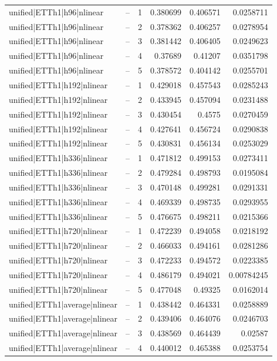 \begin{longtable}{llrrrr}
unified|ETTh1|h96|nlinear & -- & 1 & 0.380699 & 0.406571 & 0.0258711 \\
unified|ETTh1|h96|nlinear & -- & 2 & 0.378362 & 0.406257 & 0.0278954 \\
unified|ETTh1|h96|nlinear & -- & 3 & 0.381442 & 0.406405 & 0.0249623 \\
unified|ETTh1|h96|nlinear & -- & 4 & 0.37689 & 0.41207 & 0.0351798 \\
unified|ETTh1|h96|nlinear & -- & 5 & 0.378572 & 0.404142 & 0.0255701 \\
unified|ETTh1|h192|nlinear & -- & 1 & 0.429018 & 0.457543 & 0.0285243 \\
unified|ETTh1|h192|nlinear & -- & 2 & 0.433945 & 0.457094 & 0.0231488 \\
unified|ETTh1|h192|nlinear & -- & 3 & 0.430454 & 0.4575 & 0.0270459 \\
unified|ETTh1|h192|nlinear & -- & 4 & 0.427641 & 0.456724 & 0.0290838 \\
unified|ETTh1|h192|nlinear & -- & 5 & 0.430831 & 0.456134 & 0.0253029 \\
unified|ETTh1|h336|nlinear & -- & 1 & 0.471812 & 0.499153 & 0.0273411 \\
unified|ETTh1|h336|nlinear & -- & 2 & 0.479284 & 0.498793 & 0.0195084 \\
unified|ETTh1|h336|nlinear & -- & 3 & 0.470148 & 0.499281 & 0.0291331 \\
unified|ETTh1|h336|nlinear & -- & 4 & 0.469339 & 0.498735 & 0.0293955 \\
unified|ETTh1|h336|nlinear & -- & 5 & 0.476675 & 0.498211 & 0.0215366 \\
unified|ETTh1|h720|nlinear & -- & 1 & 0.472239 & 0.494058 & 0.0218192 \\
unified|ETTh1|h720|nlinear & -- & 2 & 0.466033 & 0.494161 & 0.0281286 \\
unified|ETTh1|h720|nlinear & -- & 3 & 0.472233 & 0.494572 & 0.0223385 \\
unified|ETTh1|h720|nlinear & -- & 4 & 0.486179 & 0.494021 & 0.00784245 \\
unified|ETTh1|h720|nlinear & -- & 5 & 0.477048 & 0.49325 & 0.0162014 \\
unified|ETTh1|average|nlinear & -- & 1 & 0.438442 & 0.464331 & 0.0258889 \\
unified|ETTh1|average|nlinear & -- & 2 & 0.439406 & 0.464076 & 0.0246703 \\
unified|ETTh1|average|nlinear & -- & 3 & 0.438569 & 0.464439 & 0.02587 \\
unified|ETTh1|average|nlinear & -- & 4 & 0.440012 & 0.465388 & 0.0253754 \\

\end{longtable}
